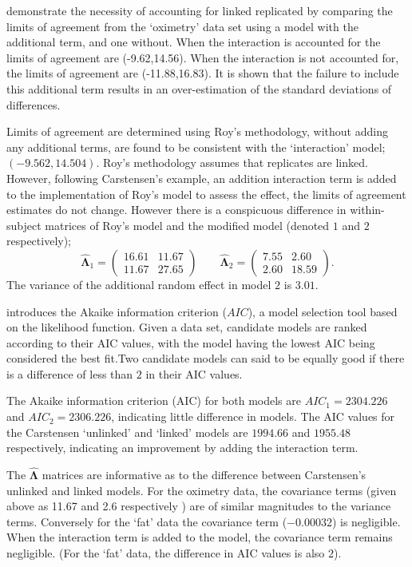 \documentclass[12pt, a4paper]{report}
\theoremstyle{plain}
\theoremstyle{definition}
\theoremstyle{remark}
\begin{document}
	\citet{BXC2008} demonstrate the necessity of accounting for linked replicated by comparing the limits of agreement from the `oximetry' data set using a model with the additional term, and one without. When the interaction is accounted for the limits of agreement are (-9.62,14.56). When the interaction is not accounted for, the limits of agreement are (-11.88,16.83). It is shown that the failure to include this additional term results in an over-estimation of the standard deviations of differences.
	
Limits of agreement are determined using Roy's methodology, without adding any additional terms, are found to be consistent with the `interaction' model; $(-9.562, 14.504 )$. Roy's methodology assumes that replicates are linked. However, following Carstensen's example, an addition interaction term is added to the implementation of Roy's model to assess the effect, the limits of agreement estimates do not change. However there is a conspicuous difference in within-subject matrices of Roy's model and the modified model (denoted $1$ and $2$ respectively);
\begin{equation}
	\hat{\boldsymbol{\Lambda}}_{1}= \left(\begin{array}{cc}
		16.61 &	11.67\\
		11.67 & 27.65 \end{array}\right) \qquad
	\boldsymbol{\hat{\Lambda}}_{2}= \left( \begin{array}{cc}
		7.55 & 2.60 \\
		2.60 & 18.59 \end{array} \right). 
\end{equation}
	The variance of the additional random effect in model $2$ is $3.01$.

		
		\citet{akaike} introduces the Akaike information criterion ($AIC$), a model 
		selection tool based on the likelihood function. Given a data set, candidate models
		are ranked according to their AIC values, with the model having the lowest AIC being considered the best fit.Two candidate models can said to be equally good if there is a difference of less than $2$ in their AIC values.
		
		The Akaike information criterion (AIC) for both models are $AIC_{1} = 2304.226$ and $AIC_{2} = 2306.226$, indicating little difference in models. The AIC values for the Carstensen `unlinked' and `linked' models are $1994.66$ and $1955.48$ respectively, indicating an improvement by adding the interaction term.

	
	The $\boldsymbol{\hat{\Lambda}}$ matrices are informative as to the difference between Carstensen's unlinked and linked models. For the oximetry data, the covariance terms (given above as 11.67 and 2.6 respectively ) are of similar magnitudes to the variance terms. Conversely for the `fat' data the covariance term ($-0.00032$) is negligible. When the interaction term is added to the model, the covariance term remains negligible. (For the `fat' data, the difference in AIC values is also $2$).
	
\end{document}
